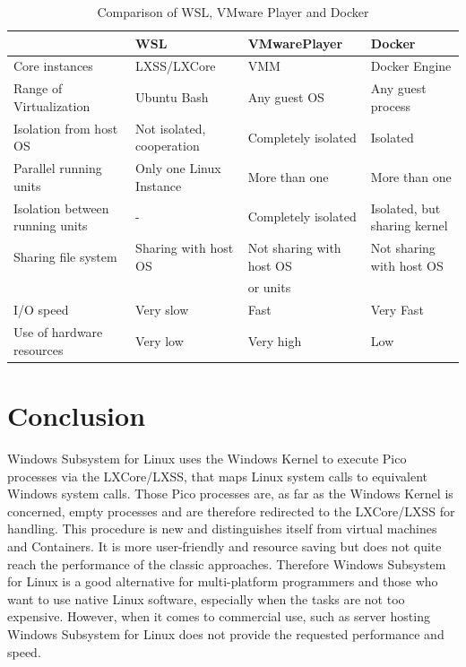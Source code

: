 \documentclass[utf8,biblatex, ngerman, english]{lni}
\begin{document}
\clearpage
\begin{table}[!htbp]
\centering
\begin{tabular}{|l||l||l|l|} 
\hline
& WSL & VMwarePlayer & Docker \\ \hline 
Core instances & LXSS/LXCore &  VMM & Docker Engine \\ \hline 
Range of Virtualization & Ubuntu Bash & Any guest OS & Any guest process \\ \hline
Isolation from host OS & Not isolated, cooperation & Completely isolated & Isolated \\ \hline
Parallel running units & Only one Linux Instance & More than one  & More than one \\ \hline
Isolation between running units & -  &  Completely isolated & Isolated, but sharing kernel\\ \hline 
Sharing file system &  Sharing with host OS & Not sharing with host OS & Not sharing with host OS \\ 
& & or units & \\ \hline
I/O speed & Very slow & Fast & Very Fast \\ \hline
Use of hardware resources & Very low & Very high & Low \\ \hline

\end{tabular}
\caption{Comparison of WSL, VMware Player and Docker}
\label{tab:demo}
\end{table}


\section{Conclusion}
Windows Subsystem for Linux uses the Windows Kernel to execute Pico processes via the LXCore/LXSS, that maps Linux system calls to equivalent Windows system calls. Those Pico processes are, as far as the Windows Kernel is concerned, empty processes and are therefore redirected to the LXCore/LXSS for handling. This procedure is new and distinguishes itself from virtual machines and Containers. It is more user-friendly and resource saving but does not quite reach the performance of the classic approaches. Therefore Windows Subsystem for Linux is a good alternative for multi-platform programmers and those who want to use native Linux software, especially when the tasks are not too expensive. However, when it comes to commercial use, such as server hosting Windows Subsystem for Linux does not provide the requested performance and speed.

\newpage
{}
\printbibliography
\end{document}

